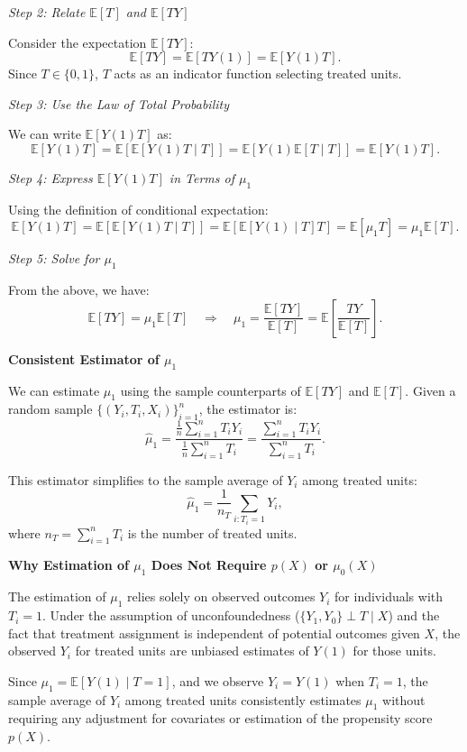 \documentclass{article}
\begin{document}
\textit{Step 2: Relate \(\mathbb{E}[T]\) and \(\mathbb{E}[T Y]\)}

Consider the expectation \(\mathbb{E}[T Y]\):
\[
\mathbb{E}[T Y] = \mathbb{E}[T Y(1)] = \mathbb{E}[Y(1) T].
\]
Since \(T \in \{0,1\}\), \(T\) acts as an indicator function selecting treated units.

\textit{Step 3: Use the Law of Total Probability}

We can write \(\mathbb{E}[Y(1) T]\) as:
\[
\mathbb{E}[Y(1) T] = \mathbb{E}\left[ \mathbb{E}[Y(1) T \mid T] \right] = \mathbb{E}\left[ Y(1) \mathbb{E}[T \mid T] \right] = \mathbb{E}\left[ Y(1) T \right].
\]

\textit{Step 4: Express \(\mathbb{E}[Y(1) T]\) in Terms of \(\mu_1\)}

Using the definition of conditional expectation:
\[
\mathbb{E}[Y(1) T] = \mathbb{E}\left[ \mathbb{E}[Y(1) T \mid T] \right] = \mathbb{E}\left[ \mathbb{E}[Y(1) \mid T] T \right] = \mathbb{E}\left[ \mu_1 T \right] = \mu_1 \mathbb{E}[T].
\]

\textit{Step 5: Solve for \(\mu_1\)}

From the above, we have:
\[
\mathbb{E}[T Y] = \mu_1 \mathbb{E}[T] \quad \Rightarrow \quad \mu_1 = \frac{\mathbb{E}[T Y]}{\mathbb{E}[T]} = \mathbb{E}\left[ \frac{T Y}{\mathbb{E}[T]} \right].
\]

\textbf{Consistent Estimator of \(\mu_1\)}

We can estimate \(\mu_1\) using the sample counterparts of \(\mathbb{E}[T Y]\) and \(\mathbb{E}[T]\). Given a random sample \(\{(Y_i, T_i, X_i)\}_{i=1}^n\), the estimator is:
\[
\hat{\mu}_1 = \frac{\frac{1}{n} \sum_{i=1}^n T_i Y_i}{\frac{1}{n} \sum_{i=1}^n T_i} = \frac{\sum_{i=1}^n T_i Y_i}{\sum_{i=1}^n T_i}.
\]

This estimator simplifies to the sample average of \(Y_i\) among treated units:
\[
\hat{\mu}_1 = \frac{1}{n_T} \sum_{i: T_i = 1} Y_i,
\]
where \(n_T = \sum_{i=1}^n T_i\) is the number of treated units.

\textbf{Why Estimation of \(\mu_1\) Does Not Require \(p(X)\) or \(\mu_0(X)\)}

The estimation of \(\mu_1\) relies solely on observed outcomes \(Y_i\) for individuals with \(T_i = 1\). Under the assumption of unconfoundedness (\(\{Y_1, Y_0\} \perp T \mid X\)) and the fact that treatment assignment is independent of potential outcomes given \(X\), the observed \(Y_i\) for treated units are unbiased estimates of \(Y(1)\) for those units.

Since \(\mu_1 = \mathbb{E}[Y(1) \mid T = 1]\), and we observe \(Y_i = Y(1)\) when \(T_i = 1\), the sample average of \(Y_i\) among treated units consistently estimates \(\mu_1\) without requiring any adjustment for covariates or estimation of the propensity score \(p(X)\).
\end{document}
